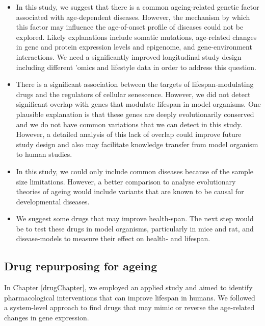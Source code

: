\documentclass[12pt,twoside]{unicam}
\providecommand{\tightlist}{%
  \setlength{\itemsep}{0pt}\setlength{\parskip}{0pt}}
\begin{document}
\begin{itemize}
\tightlist
\item
  In this study, we suggest that there is a common ageing-related genetic factor associated with age-dependent diseases. However, the mechanism by which this factor may influence the age-of-onset profile of diseases could not be explored. Likely explanations include somatic mutations, age-related changes in gene and protein expression levels and epigenome, and gene-environment interactions. We need a significantly improved longitudinal study design including different 'omics and lifestyle data in order to address this question.
\item
  There is a significant association between the targets of lifespan-modulating drugs and the regulators of cellular senescence. However, we did not detect significant overlap with genes that modulate lifespan in model organisms. One plausible explanation is that these genes are deeply evolutionarily conserved and we do not have common variations that we can detect in this study. However, a detailed analysis of this lack of overlap could improve future study design and also may facilitate knowledge transfer from model organism to human studies.
\item
  In this study, we could only include common diseases because of the sample size limitations. However, a better comparison to analyse evolutionary theories of ageing would include variants that are known to be causal for developmental diseases.
\item
  We suggest some drugs that may improve health-span. The next step would be to test these drugs in model organisms, particularly in mice and rat, and disease-models to measure their effect on health- and lifespan.
\end{itemize}

\hypertarget{drug-repurposing-for-ageing}{%
\subsection{Drug repurposing for ageing}\label{drug-repurposing-for-ageing}}

In Chapter \ref{drugChapter}, we employed an applied study and aimed to identify pharmacological interventions that can improve lifespan in humans. We followed a system-level approach to find drugs that may mimic or reverse the age-related changes in gene expression.
\end{document}
